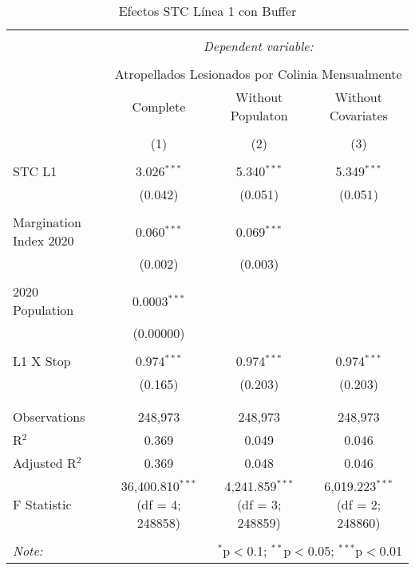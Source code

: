 
\begin{table}[!htbp] \centering 
  \caption{Efectos STC Línea 1 con Buffer} 
  \label{} 
\begin{tabular}{@{\extracolsep{5pt}}lccc} 
\\[-1.8ex]\hline 
\hline \\[-1.8ex] 
 & \multicolumn{3}{c}{\textit{Dependent variable:}} \\ 
\cline{2-4} 
\\[-1.8ex] & \multicolumn{3}{c}{Atropellados Lesionados por Colinia Mensualmente} \\ 
 & Complete & Without Populaton & Without Covariates \\ 
\\[-1.8ex] & (1) & (2) & (3)\\ 
\hline \\[-1.8ex] 
 STC L1 & 3.026$^{***}$ & 5.340$^{***}$ & 5.349$^{***}$ \\ 
  & (0.042) & (0.051) & (0.051) \\ 
  & & & \\ 
 Margination Index 2020 & 0.060$^{***}$ & 0.069$^{***}$ &  \\ 
  & (0.002) & (0.003) &  \\ 
  & & & \\ 
 2020 Population & 0.0003$^{***}$ &  &  \\ 
  & (0.00000) &  &  \\ 
  & & & \\ 
 L1 X Stop & 0.974$^{***}$ & 0.974$^{***}$ & 0.974$^{***}$ \\ 
  & (0.165) & (0.203) & (0.203) \\ 
  & & & \\ 
\hline \\[-1.8ex] 
Observations & 248,973 & 248,973 & 248,973 \\ 
R$^{2}$ & 0.369 & 0.049 & 0.046 \\ 
Adjusted R$^{2}$ & 0.369 & 0.048 & 0.046 \\ 
F Statistic & 36,400.810$^{***}$ (df = 4; 248858) & 4,241.859$^{***}$ (df = 3; 248859) & 6,019.223$^{***}$ (df = 2; 248860) \\ 
\hline 
\hline \\[-1.8ex] 
\textit{Note:}  & \multicolumn{3}{r}{$^{*}$p$<$0.1; $^{**}$p$<$0.05; $^{***}$p$<$0.01} \\ 
\end{tabular} 
\end{table} 
